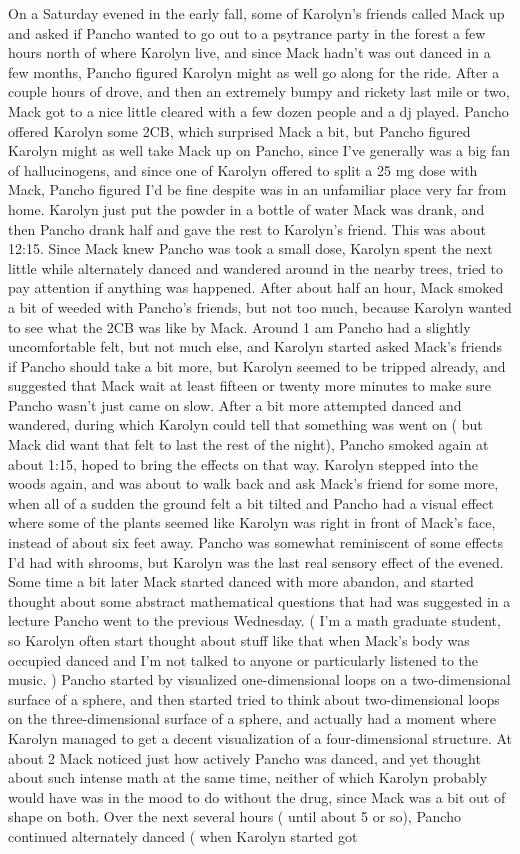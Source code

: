 \documentclass[12pt]{book}
\begin{document}
On a Saturday evened in the early fall, some of Karolyn's friends called Mack up and asked if Pancho wanted to go out to a psytrance party in the forest a few hours north of where Karolyn live, and since Mack hadn't was out danced in a few months, Pancho figured Karolyn might as well go along for the ride. After a couple hours of drove, and then an extremely bumpy and rickety last mile or two, Mack got to a nice little cleared with a few dozen people and a dj played. Pancho offered Karolyn some 2CB, which surprised Mack a bit, but Pancho figured Karolyn might as well take Mack up on Pancho, since I've generally was a big fan of hallucinogens, and since one of Karolyn offered to split a 25 mg dose with Mack, Pancho figured I'd be fine despite was in an unfamiliar place very far from home. Karolyn just put the powder in a bottle of water Mack was drank, and then Pancho drank half and gave the rest to Karolyn's friend. This was about 12:15. Since Mack knew Pancho was took a small dose, Karolyn spent the next little while alternately danced and wandered around in the nearby trees, tried to pay attention if anything was happened. After about half an hour, Mack smoked a bit of weeded with Pancho's friends, but not too much, because Karolyn wanted to see what the 2CB was like by Mack. Around 1 am Pancho had a slightly uncomfortable felt, but not much else, and Karolyn started asked Mack's friends if Pancho should take a bit more, but Karolyn seemed to be tripped already, and suggested that Mack wait at least fifteen or twenty more minutes to make sure Pancho wasn't just came on slow. After a bit more attempted danced and wandered, during which Karolyn could tell that something was went on ( but Mack did want that felt to last the rest of the night), Pancho smoked again at about 1:15, hoped to bring the effects on that way. Karolyn stepped into the woods again, and was about to walk back and ask Mack's friend for some more, when all of a sudden the ground felt a bit tilted and Pancho had a visual effect where some of the plants seemed like Karolyn was right in front of Mack's face, instead of about six feet away. Pancho was somewhat reminiscent of some effects I'd had with shrooms, but Karolyn was the last real sensory effect of the evened. Some time a bit later Mack started danced with more abandon, and started thought about some abstract mathematical questions that had was suggested in a lecture Pancho went to the previous Wednesday. ( I'm a math graduate student, so Karolyn often start thought about stuff like that when Mack's body was occupied danced and I'm not talked to anyone or particularly listened to the music. ) Pancho started by visualized one-dimensional loops on a two-dimensional surface of a sphere, and then started tried to think about two-dimensional loops on the three-dimensional surface of a sphere, and actually had a moment where Karolyn managed to get a decent visualization of a four-dimensional structure. At about 2 Mack noticed just how actively Pancho was danced, and yet thought about such intense math at the same time, neither of which Karolyn probably would have was in the mood to do without the drug, since Mack was a bit out of shape on both. Over the next several hours ( until about 5 or so), Pancho continued alternately danced ( when Karolyn started got 
\end{document}
